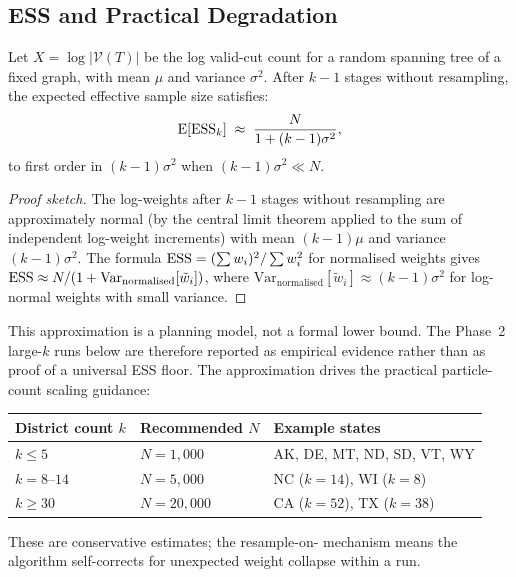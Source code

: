 \subsection{ESS and Practical Degradation}
\label{subsec:ess}

\begin{proposition}
\label{prop:ess-degrade}
Let $X=\log|\mathcal{V}(T)|$ be the log valid-cut count for a random spanning
tree of a fixed graph, with mean $\mu$ and variance $\sigma^2$.
After $k - 1$ stages without resampling, the expected effective sample size
satisfies:
\[
  \mathrm{E}[\mathrm{ESS}_k]
  \;\approx\; \frac{N}{1 + (k-1)\sigma^2},
\]
to first order in $(k-1)\sigma^2$ when $(k-1)\sigma^2 \ll N$.
\end{proposition}

\begin{proof}[Proof sketch]
The log-weights after $k-1$ stages without resampling are approximately normal
(by the central limit theorem applied to the sum of independent log-weight
increments) with mean $(k-1)\mu$ and variance $(k-1)\sigma^2$.
The \ess{} formula $\mathrm{ESS} = (\sum w_i)^2 / \sum w_i^2$ for normalised weights
gives $\mathrm{ESS} \approx N / (1 + \mathrm{Var}_{\mathrm{normalised}}[\tilde{w}_i])$,
where $\mathrm{Var}_{\mathrm{normalised}}[\tilde{w}_i] \approx (k-1)\sigma^2$
for log-normal weights with small variance.
\end{proof}

This approximation is a planning model, not a formal lower bound. The Phase~2
large-$k$ runs below are therefore reported as empirical evidence rather than
as proof of a universal ESS floor. The approximation drives the practical
particle-count scaling guidance:
\begin{center}
\renewcommand{\arraystretch}{1.3}
\begin{tabular}{@{}lll@{}}
\toprule
District count $k$ & Recommended $N$ & Example states \\
\midrule
$k \leq 5$  & $N = 1{,}000$  & AK, DE, MT, ND, SD, VT, WY \\
$k = 8$--$14$ & $N = 5{,}000$  & NC ($k=14$), WI ($k=8$) \\
$k \geq 30$ & $N = 20{,}000$ & CA ($k=52$), TX ($k=38$) \\
\bottomrule
\end{tabular}
\end{center}
These are conservative estimates; the resample-on-\ess{} mechanism means the
algorithm self-corrects for unexpected weight collapse within a run.
